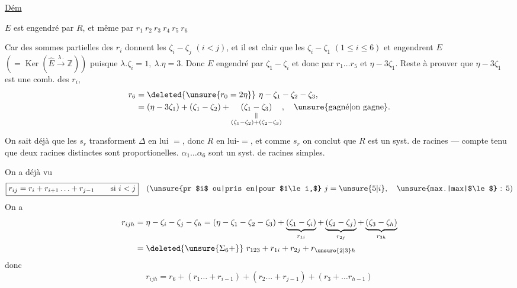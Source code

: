 \uline{Dém} 

$E$ est engendré par $R$, et même par $r_1\ r_2\ r_3\ r_4\ r_5\ r_6$

Car des sommes partielles des $r_i$  donnent les $\zeta_{i}-\zeta_j$ $(i<j)$, et il est clair que les $\zeta_i-\zeta_1$ $(1\le i\le6)$ et   engendrent $E$ $(=\operatorname{Ker}(\widehat E\xrightarrow{\lambda\, .}\mathbb Z))$ puisque  $\lambda.\zeta_i=1,\ \lambda.\eta=3$. Donc $E$ engendré
par  $\zeta_1-\zeta_i$ et  
\deleted{\unsure{$= \lambda+\eta$|$3\lambda-\eta$}} donc par $r_1\ldots r_5$ et $\eta-3\zeta_1$. Reste à prouver que $\eta-3\zeta_1$ est une comb. des $r_i$, 
\[
\begin{aligned}
r_6&=\deleted{\unsure{r_0=2\eta}}\ \eta-\zeta_1-\zeta_2-\zeta_3,\\
&=(\eta-3\zeta_1)+(\zeta_1-\zeta_2)+
\underset{\substack{\Vert\\(\zeta_1-\zeta_2)+(\zeta_2-\zeta_3)}}{(\zeta_1-\zeta_3)},\quad\text{\unsure{gagné|on gagne}.}
\end{aligned}
\]

On sait déjà que les $s_r$ transforment $\Delta$ en lui $=$, donc $R$ en lui-$=$, et comme $s_r$  on conclut que $R$ est un syst. de racines --- compte tenu que deux racines distinctes  sont  proportionelles.   $\alpha_1\ldots\alpha_6$ sont un syst. de racines simples. 

On a déjà vu
\[
\boxed{r_{ij}=r_i+r_{i+1}\ldots+r_{j-1}\qquad\text{si }i<j}
\quad\text{(\unsure{pr $i$ ou|pris en|pour $1\le i,$} }j=\unsure{5|i},\quad\text{\unsure{max.|max|$\le$} : }5\text{)}
\]
On a
\[
\begin{aligned}
r_{ijh}&=\eta-\zeta_i-\zeta_j-\zeta_h=(\eta-\zeta_1-\zeta_2-\zeta_3)
+\underbrace{(\zeta_1-\zeta_i)}_{r_{1i}}+\underbrace{(\zeta_2-\zeta_j)}_{r_{2j}}+\underbrace{(\zeta_3-\zeta_h)}_{r_{3h}}\\
&=\deleted{\unsure{\Sigma_6+}}\ r_{123}+r_{1i}+r_{2j}+r_{\unsure{2|3}h}
\end{aligned}
\]
donc
\[
r_{ijh}=r_6+(r_1\ldots+r_{i-1})+(r_2\ldots+r_{j-1})+(r_3+\ldots r_{h-1})
\]
